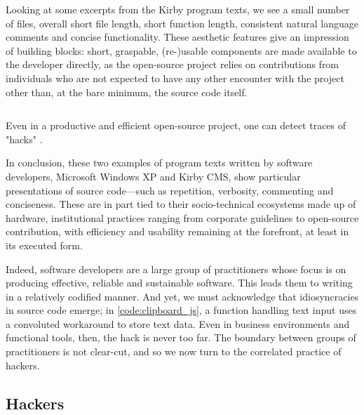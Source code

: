 Looking at some excerpts from the Kirby program texts, we see a small number of files, overall short file length, short function length, consistent natural language comments and concise functionality. These aesthetic features give an impression of building blocks: short, graspable, (re-)usable components are made available to the developer directly, as the open-source project relies on contributions from individuals who are not expected to have any other encounter with the project other than, at the bare minimum, the source code itself.

\begin{listing}
  \inputminted{js}{./corpus/clipboard.js}
  \caption{Even in a productive and efficient open-source project, one can detect traces of "hacks" \citep{allgeier_clipboard_2021}.}
  \label{code:clipboard_js}
\end{listing}

In conclusion, these two examples of program texts written by software developers, Microsoft Windows XP and Kirby CMS, show particular presentations of source code—such as repetition, verbosity, commenting and conciseness. These are in part tied to their socio-technical ecosystems made up of hardware, institutional practices ranging from corporate guidelines to open-source contribution, with efficiency and usability remaining at the forefront, at least in its executed form.

Indeed, software developers are a large group of practitioners whose focus is on producing effective, reliable and sustainable software. This leads them to writing in a relatively codified manner. And yet, we must acknowledge that idiosyncracies in source code emerge; in \autoref{code:clipboard_js}, a function handling text input uses a convoluted workaround to store text data. Even in business environments and functional tools, then, the hack is never too far. The boundary between groups of practitioners is not clear-cut, and so we now turn to the correlated practice of hackers.

\subsection{Hackers}
\label{subsec:hackers}


